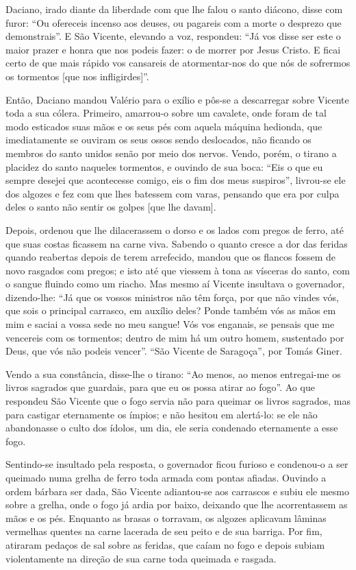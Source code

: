 \documentclass[a4paper,14pt]{extarticle} \usepackage[utf8]{inputenc}
\begin{document}
Daciano, irado diante da liberdade com que lhe falou o santo diácono, disse com furor: “Ou ofereceis incenso aos deuses, ou pagareis com a morte o desprezo que demonstrais”. E São Vicente, elevando a voz, respondeu: “Já vos disse ser este o maior prazer e honra que nos podeis fazer: o de morrer por Jesus Cristo. E ficai certo de que mais rápido vos cansareis de atormentar-nos do que nós de sofrermos os tormentos [que nos infligirdes]”.

Então, Daciano mandou Valério para o exílio e pôs-se a descarregar sobre Vicente toda a sua cólera. Primeiro, amarrou-o sobre um cavalete, onde foram de tal modo esticados suas mãos e os seus pés com aquela máquina hedionda, que imediatamente se ouviram os seus ossos sendo deslocados, não ficando os membros do santo unidos senão por meio dos nervos. Vendo, porém, o tirano a placidez do santo naqueles tormentos, e ouvindo de sua boca: “Eis o que eu sempre desejei que acontecesse comigo, eis o fim dos meus suspiros”, livrou-se ele dos algozes e fez com que lhes batessem com varas, pensando que era por culpa deles o santo não sentir os golpes [que lhe davam]. 

Depois, ordenou que lhe dilacerassem o dorso e os lados com pregos de ferro, até que suas costas ficassem na carne viva. Sabendo o quanto cresce a dor das feridas quando reabertas depois de terem arrefecido, mandou que os flancos fossem de novo rasgados com pregos; e isto até que viessem à tona as vísceras do santo, com o sangue fluindo como um riacho. Mas mesmo aí Vicente insultava o governador, dizendo-lhe: “Já que os vossos ministros não têm força, por que não vindes vós, que sois o principal carrasco, em auxílio deles? Ponde também vós as mãos em mim e saciai a vossa sede no meu sangue! Vós vos enganais, se pensais que me vencereis com os tormentos; dentro de mim há um outro homem, sustentado por Deus, que vós não podeis vencer”. 
“São Vicente de Saragoça”, por Tomás Giner.

Vendo a sua constância, disse-lhe o tirano: “Ao menos, ao menos entregai-me os livros sagrados que guardais, para que eu os possa atirar ao fogo”. Ao que respondeu São Vicente que o fogo servia não para queimar os livros sagrados, mas para castigar eternamente os ímpios; e não hesitou em alertá-lo: se ele não abandonasse o culto dos ídolos, um dia, ele seria condenado eternamente a esse fogo.

Sentindo-se insultado pela resposta, o governador ficou furioso e condenou-o a ser queimado numa grelha de ferro toda armada com pontas afiadas. Ouvindo a ordem bárbara ser dada, São Vicente adiantou-se aos carrascos e subiu ele mesmo sobre a grelha, onde o fogo já ardia por baixo, deixando que lhe acorrentassem as mãos e os pés. Enquanto as brasas o torravam, os algozes aplicavam lâminas vermelhas quentes na carne lacerada de seu peito e de sua barriga. Por fim, atiraram pedaços de sal sobre as feridas, que caíam no fogo e depois subiam violentamente na direção de sua carne toda queimada e rasgada.
\end{document}
